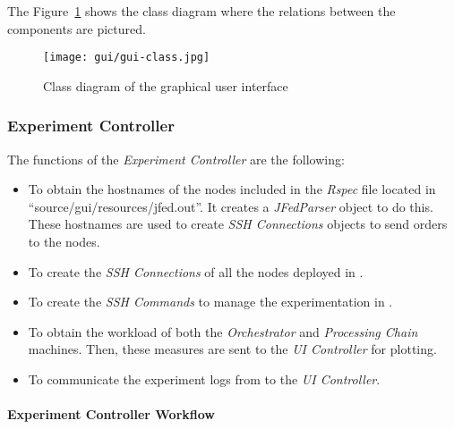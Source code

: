 The Figure~\ref{fig:gui-class} shows the class diagram where the relations between the components are pictured.

\begin{figure}[!h]
\begin{center}
\texttt{[image: gui/gui-class.jpg]}
\caption{Class diagram of the graphical user interface}
\label{fig:gui-class}
\end{center}
\end{figure}


\subsubsection{Experiment Controller}

The functions of the \emph{Experiment Controller} are the following:
\begin{itemize}
\item To obtain the hostnames of the \vw nodes included in the \emph{Rspec} file located in ``source/gui/resources/jfed.out''. It creates a \emph{JFedParser} object to do this. These hostnames are used to create \emph{SSH Connections} objects to send orders to the \vw nodes.
\item To create the \emph{SSH Connections} of all the nodes deployed in \vw.
\item To create the \emph{SSH Commands} to manage the experimentation in \vw.
\item To obtain the workload of both the \emph{Orchestrator} and \emph{Processing Chain} machines. Then, these measures are sent to the \emph{UI Controller} for plotting.
\item To communicate the experiment logs from \vw to the \emph{UI Controller}.
\end{itemize}

\paragraph{Experiment Controller Workflow}~\\

